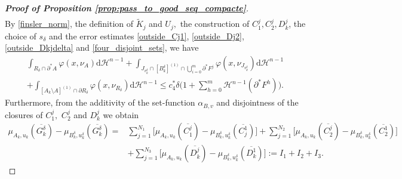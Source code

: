 \documentclass[reqno]{amsart}
\numberwithin{equation}{section}
\theoremstyle{plain}
\theoremstyle{definition}
\newcommand{\cH}{\mathcal{H}}
\newcommand{\p}{\partial}
\newcommand{\cl}[1]{\overline{#1}}
\renewcommand{\d}{\mathrm{d}}
\renewcommand{\tilde}{\widetilde}
\begin{document}
\begin{proof}[\textbf{Proof of Proposition \ref{prop:pass_to_good_seq_compacte}}]
\begin{multline}
\end{multline}
By \eqref{finsler_norm}, the definition of $\tilde K_j$ and $U_j,$ the construction of $C_1^j,C_2^j,D_k^j$, the choice of $s_\delta$ and the error estimates \eqref{outside_Cj1}, \eqref{outside_Dj2}, \eqref{outside_Dkjdelta} and \eqref{four_disjoint_sets}, we have
%
\begin{multline}
\int_{R_\delta\cap \p^*A} \varphi(x,\nu_A)\d\cH^{n-1} +
\int_{J_{v_k^\delta}\cap [B_k^\delta]^{(1)}\cap \bigcup_{i=0}^m\p^*F^j} \varphi(x,\nu_{J_{v_k^\delta}})\d\cH^{n-1}\\
+ \int_{[A_k\setminus A]^{(1)}\cap \p R_\delta} \varphi(x,\nu_{R_\delta})\d \cH^{n-1} \le c_4^*\delta\Big(1 + \sum\limits_{h=0}^m\cH^{n-1}(\p^*F^h)\Big).
\label{first_error0901}
\end{multline}
Furthermore, from the additivity of the set-function $\alpha_{B,v}$ and disjointness of the closures of $C_1^j,$ $C_2^j$ and $D_k^j$ we obtain
%
\begin{align}
\mu_{A_k,u_k}(\cl{G_k^\delta}) - \mu_{B_k^\delta,u_k^\delta}(\cl{G_k^\delta})  
= & \sum\limits_{j=1}^{N_1} \Big[\mu_{A_k,u_k}(\cl{C_1^j}) - \mu_{B_k^\delta,u_k^\delta}(\cl{C_j^1})\Big]
+  
\sum\limits_{j=1}^{N_2} \Big[\mu_{A_k,u_k}(\cl{C_2^j}) - \mu_{B_k^\delta,u_k^\delta}(\cl{C_2^1})\Big] \nonumber \\
& + \sum\limits_{j=1}^{N_3} \Big[\mu_{A_k,u_k}(\cl{D_k^j}) - \mu_{B_k^\delta,u_k^\delta}(\cl{D_k^1})\Big]:=I_1+I_2+I_3.
\label{don_oomar_imala}
\end{align}


\end{proof}
\end{document}
